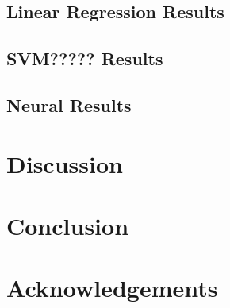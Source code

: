 \documentclass[11pt]{article}
\begin{document}
\subsection{Linear Regression Results}


\subsection{SVM????? Results}


\subsection{Neural Results}


\section{Discussion}


\section{Conclusion}


\section*{Acknowledgements}







\end{document}

